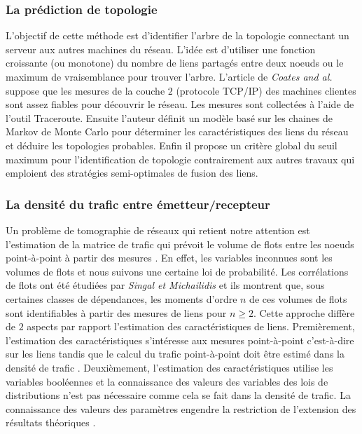 \vspace{-0.4cm}  
\subsubsection{La pr\'ediction de topologie} 

L'objectif de cette m\'ethode est d'identifier l'arbre de la topologie connectant un serveur aux autres machines du r\'eseau.
L'id\'ee est d'utiliser une fonction croissante (ou monotone) du nombre de liens partag\'es entre deux noeuds ou le maximum de vraisemblance pour trouver l'arbre.
\newline
L'article de {\em Coates and al.} \cite{coatesCastroNowak2002} suppose que les mesures de la couche $2$ (protocole TCP/IP) des machines clientes sont assez fiables pour d\'ecouvrir le r\'eseau. Les mesures sont collect\'ees \`a l'aide de l'outil Traceroute. Ensuite l'auteur d\'efinit un mod\`ele bas\'e sur les chaines de Markov de Monte Carlo pour d\'eterminer les caract\'eristiques des liens du r\'eseau et d\'eduire les topologies probables. Enfin il propose un crit\`ere global du seuil maximum pour l'identification de topologie contrairement aux autres travaux \cite{andrieuDoucetFitzgerald2000bayesian, bestavrosAzerByers2005inference} qui emploient des strat\'egies semi-optimales de fusion des liens.
 
\subsubsection{La densit\'e du trafic entre \'emetteur/recepteur}

 Un probl\`eme de tomographie de r\'eseaux qui retient notre attention est l'estimation de la matrice de trafic qui pr\'evoit le volume de flots entre les noeuds point-\`a-point \`a partir des mesures \cite{vardi1996, caoDavisWielYu2000}.
En effet, les variables inconnues sont les volumes de flots et nous suivons une certaine loi de probabilit\'e.
\newline
Les corr\'elations de flots ont \'et\'e \'etudi\'ees par {\em Singal et Michailidis} \cite{singalMichailidis2007} et ils montrent que, sous certaines classes de d\'ependances, les moments d'ordre $n$ de ces volumes de flots sont identifiables \`a partir des mesures de liens pour $n \ge 2$.
Cette approche diff\`ere de $2$ aspects par rapport l'estimation des caract\'eristiques de liens.
Premi\`erement, l'estimation des caract\'eristiques s'int\'eresse aux mesures point-\`a-point c'est-\`a-dire sur les liens tandis que le calcul du trafic point-\`a-point doit \^etre estim\'e dans la densit\'e de trafic \cite{vardi1996, singalMichailidis2007, caoDavisWielYu2000}.
Deuxi\`emement, l'estimation des caract\'eristiques utilise les variables bool\'eennes et la connaissance des valeurs des variables des lois de distributions n'est pas n\'ecessaire comme cela se fait dans la densit\'e de trafic. La connaissance des valeurs des param\`etres engendre la restriction de l'extension des r\'esultats th\'eoriques \cite{singalMichailidis2007}.
\newline

